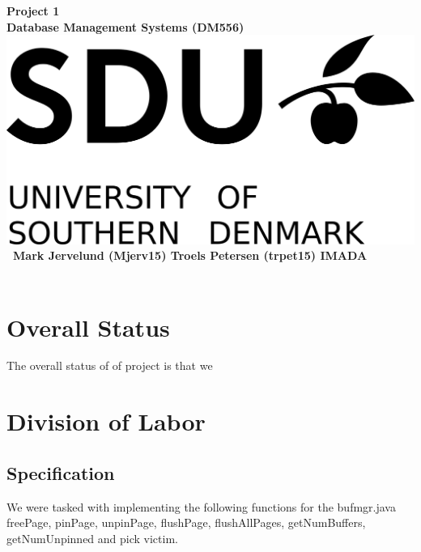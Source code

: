 \documentclass[a4paper,10pt,titlepage]{report}
\date{}
\begin{document}
\begin{titlepage}
\centering
    \vspace*{9\baselineskip}
    \huge
    \bfseries
    Project 1\\
    
    \normalfont 
	\huge    
    Database Management Systems (DM556)  \\[4\baselineskip]
    \normalfont
	\includegraphics[scale=1.5]{SDU_Logo}
    \vfill\ 
    Mark Jervelund (Mjerv15) Troels Petersen (trpet15)
    \vspace{5mm}
    IMADA \\
    \textbf{\datedate} \\[2\baselineskip]
\end{titlepage}

\setcounter{page}{1}
\renewcommand{\thepage}{\arabic{page}}

\lstset{language=Java}          %
\section{Overall Status}
The overall status of of project is that we 
\section{Division of Labor}
\subsection{Specification}
We were tasked with implementing the following functions for the bufmgr.java\\

freePage, pinPage, unpinPage, flushPage, flushAllPages, getNumBuffers, getNumUnpinned and pick victim. \\
\end{document}
